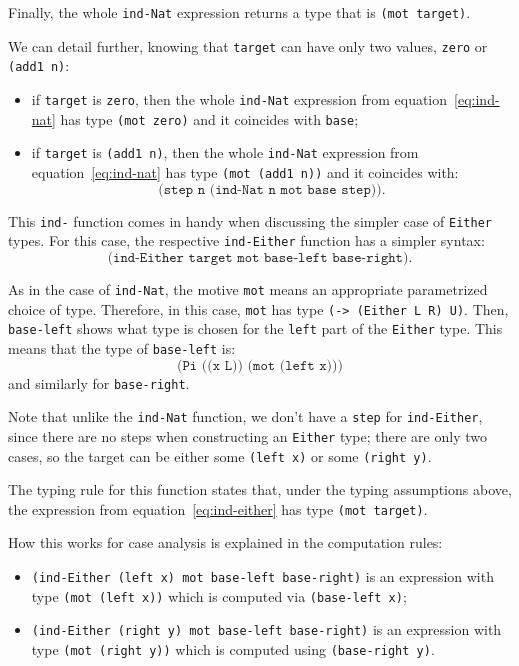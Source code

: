 Finally, the whole \texttt{ind-Nat} expression returns a type that is
\texttt{(mot target)}.

We can detail further, knowing that \texttt{target} can have only
two values, \texttt{zero} or \texttt{(add1 n)}:
\begin{itemize}
\item if \texttt{target} is \texttt{zero}, then the whole \texttt{ind-Nat}
  expression from equation~\eqref{eq:ind-nat}
  has type \texttt{(mot zero)} and it coincides with \texttt{base};
\item if \texttt{target} is \texttt{(add1 n)}, then the whole \texttt{ind-Nat}
  expression from equation~\eqref{eq:ind-nat} has type \texttt{(mot (add1 n))}
  and it coincides with:
  \[
    \texttt{(step n (ind-Nat n mot base step))}.
  \]
\end{itemize}

\vspace{0.3cm}


This \texttt{ind-} function comes in handy when discussing the
simpler case of \texttt{Either} types. For this case, the
respective \texttt{ind-Either} function has a simpler syntax:
\begin{equation}
  \label{eq:ind-either}
  \texttt{(ind-Either target mot base-left base-right)}.
\end{equation}

As in the case of \texttt{ind-Nat}, the motive \texttt{mot} means
an appropriate parametrized choice of type. Therefore, in this
case, \texttt{mot} has type \texttt{(-> (Either L R) U)}. Then,
\texttt{base-left} shows what type is chosen for the \texttt{left}
part of the \texttt{Either} type. This means that the type of
\texttt{base-left} is:
\[
  \texttt{(Pi ((x L)) (mot (left x)))}
\]
and similarly for \texttt{base-right}.

Note that unlike the \texttt{ind-Nat} function, we don't have a
\texttt{step} for \texttt{ind-Either}, since there are no steps
when constructing an \texttt{Either} type; there are only two cases,
so the target can be either some \texttt{(left x)} or some
\texttt{(right y)}.

The typing rule for this function states that, under the typing
assumptions above, the expression from equation~\eqref{eq:ind-either}
has type \texttt{(mot target)}.

How this works for case analysis is explained in the computation rules:
\begin{itemize}
\item \texttt{(ind-Either (left x) mot base-left base-right)} is an
  expression with type \texttt{(mot (left x))} which is computed
  via \texttt{(base-left x)};
\item \texttt{(ind-Either (right y) mot base-left base-right)} is an
  expression with type \texttt{(mot (right y))} which is computed
  using \texttt{(base-right y)}.
\end{itemize}

